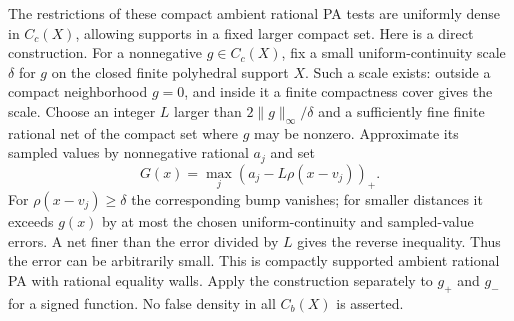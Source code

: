\documentclass[11pt]{article}
\begin{document}
The restrictions of these compact ambient rational PA tests are uniformly
dense in $C_c(X)$, allowing supports in a fixed larger compact set.
Here is a direct construction. For a nonnegative $g\in C_c(X)$, fix a
small uniform-continuity scale $\delta$ for $g$ on the closed finite
polyhedral support $X$. Such a scale exists: outside a compact
neighborhood $g=0$, and inside it a finite compactness cover gives the
scale. Choose an integer $L$ larger than $2\|g\|_\infty/\delta$ and a
sufficiently fine finite rational net of the compact set where $g$ may
be nonzero. Approximate its sampled values by nonnegative rational
$a_j$ and set
\[
 G(x)=\max_j(a_j-L\rho(x-v_j))_+.
\]
For $\rho(x-v_j)\geq\delta$ the corresponding bump vanishes;
for smaller distances it exceeds $g(x)$ by at most the chosen
uniform-continuity and sampled-value errors. A net finer than the
error divided by $L$ gives the reverse inequality. Thus the error
can be arbitrarily small. This is compactly supported ambient rational
PA with rational equality walls. Apply the construction separately to
$g_+$ and $g_-$ for a signed function. No false density in all
$C_b(X)$ is asserted.
\end{document}
